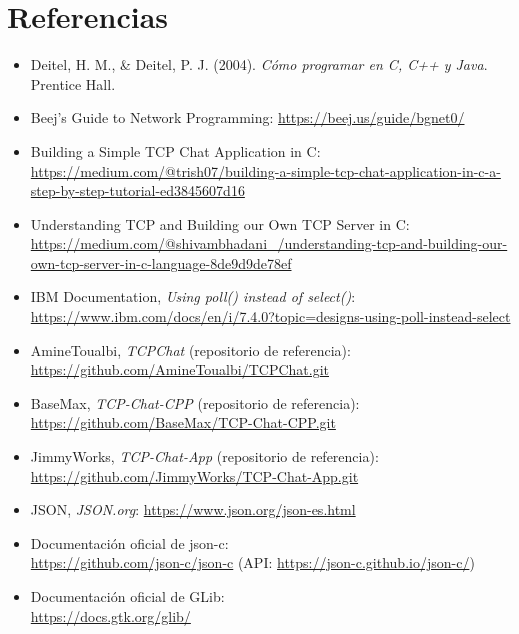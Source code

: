 \documentclass[12pt,a4paper]{article}
\begin{document}
\section{Referencias}

\begin{itemize}
    \item Deitel, H. M., \& Deitel, P. J. (2004). \textit{Cómo programar en C, C++ y Java}. Prentice Hall.
    \item Beej's Guide to Network Programming: \url{https://beej.us/guide/bgnet0/}
    \item Building a Simple TCP Chat Application in C:\\
     \url{https://medium.com/@trish07/building-a-simple-tcp-chat-application-in-c-a-step-by-step-tutorial-ed3845607d16}
    \item Understanding TCP and Building our Own TCP Server in C:\\
     \url{https://medium.com/@shivambhadani_/understanding-tcp-and-building-our-own-tcp-server-in-c-language-8de9d9de78ef}
    \item IBM Documentation, \textit{Using poll() instead of select()}:\\
     \url{https://www.ibm.com/docs/en/i/7.4.0?topic=designs-using-poll-instead-select}
    \item AmineToualbi, \textit{TCPChat} (repositorio de referencia):\\
     \url{https://github.com/AmineToualbi/TCPChat.git}
    \item BaseMax, \textit{TCP-Chat-CPP} (repositorio de referencia): \\
    \url{https://github.com/BaseMax/TCP-Chat-CPP.git}
    \item JimmyWorks, \textit{TCP-Chat-App} (repositorio de referencia):\\ 
    \url{https://github.com/JimmyWorks/TCP-Chat-App.git}
    \item JSON, \textit{JSON.org}: \url{https://www.json.org/json-es.html}
    \item Documentación oficial de json-c:\\
     \url{https://github.com/json-c/json-c} (API: \url{https://json-c.github.io/json-c/})
    \item Documentación oficial de GLib:\\
     \url{https://docs.gtk.org/glib/}
\end{itemize}

\appendix
\end{document}
